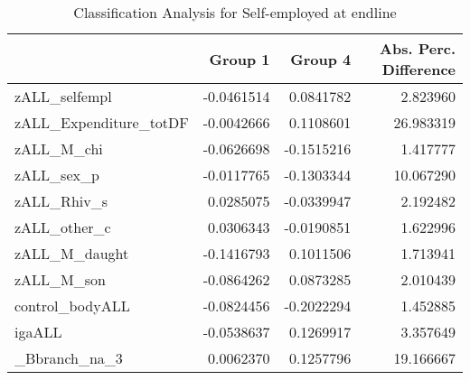 \begin{table}

\caption{\label{tab:clanQselfempl}Classification Analysis for Self-employed at endline}
\centering
\begin{tabular}[t]{lrrr}
\toprule
  & Group 1 & Group 4 & Abs. Perc. Difference\\
\midrule
zALL\_selfempl & -0.0461514 & 0.0841782 & 2.823960\\
zALL\_Expenditure\_totDF & -0.0042666 & 0.1108601 & 26.983319\\
zALL\_M\_chi & -0.0626698 & -0.1515216 & 1.417777\\
zALL\_sex\_p & -0.0117765 & -0.1303344 & 10.067290\\
zALL\_Rhiv\_s & 0.0285075 & -0.0339947 & 2.192482\\
\addlinespace
zALL\_other\_c & 0.0306343 & -0.0190851 & 1.622996\\
zALL\_M\_daught & -0.1416793 & 0.1011506 & 1.713941\\
zALL\_M\_son & -0.0864262 & 0.0873285 & 2.010439\\
control\_bodyALL & -0.0824456 & -0.2022294 & 1.452885\\
igaALL & -0.0538637 & 0.1269917 & 3.357649\\
\addlinespace
\_Bbranch\_na\_3 & 0.0062370 & 0.1257796 & 19.166667\\
\bottomrule
\end{tabular}
\end{table}
